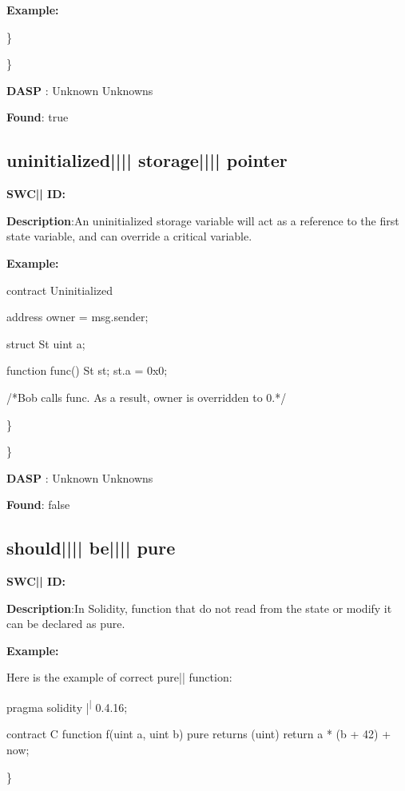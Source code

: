 \documentclass{article}
\begin{document}
\textbf{Example:} 
\begin{ffcode} 


\end{ffcode} 
\} 

\} 

\textbf{DASP} : Unknown Unknowns

\textbf{Found}: true

\subsection{uninitialized{||\textunderscore|| }storage{||\textunderscore|| }pointer} 
\textbf{SWC{|\textunderscore| }ID:} 

\textbf{Description}:An uninitialized storage variable will act as a reference to the first state variable, and can override a critical variable.


\textbf{Example:} 
\begin{ffcode} 

contract Uninitialized{
    address owner = msg.sender;

    struct St{
        uint a;
    }

    function func() {
        St st;
        st.a = 0x0;
    }
}
 /*Bob calls func. As a result, owner is overridden to 0.*/ 

\end{ffcode} 
\} 

\} 

\textbf{DASP} : Unknown Unknowns

\textbf{Found}: false

\subsection{should{||\textunderscore|| }be{||\textunderscore|| }pure} 
\textbf{SWC{|\textunderscore| }ID:} 

\textbf{Description}:In Solidity, function that do not read from the state or modify it can be declared as pure.


\textbf{Example:} 
\begin{ffcode} 

Here is the example of correct pure|\textendash| function:

pragma solidity |\textsuperscript| 0.4.16;

contract C {
    function f(uint a, uint b) pure returns (uint) {
        return a * (b + 42) + now;
    }
}

\end{ffcode} 
\} 
\end{document}
